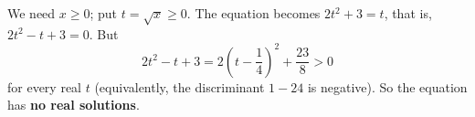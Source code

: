 We need $x\ge0$; put $t=\sqrt x\ge0$. The equation becomes $2t^2+3=t$, that is, $2t^2-t+3=0$. But
\[2t^2-t+3=2\left(t-\dfrac{1}{4}\right)^2+\dfrac{23}{8}>0\]
for every real $t$ (equivalently, the discriminant $1-24$ is negative). So the equation has \textbf{no real solutions}.
